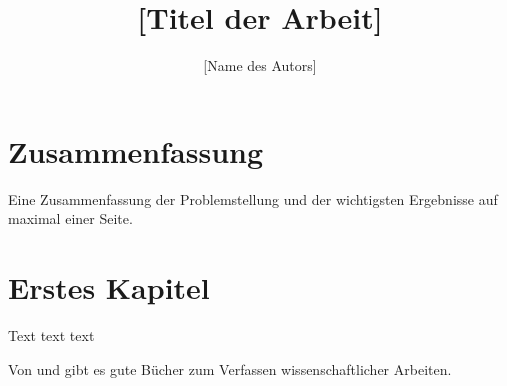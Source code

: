 \documentclass[doctype=Diplomarbeit,lang=ngerman]{ldvbook}
\begin{document}
\title{[Titel der Arbeit]}
\author{[Name des Autors]}
\maketitle


\chapter*{Zusammenfassung}

Eine Zusammenfassung der Problemstellung und der wichtigsten
Ergebnisse auf maximal einer Seite.


\tableofcontents






\chapter{Erstes Kapitel}

Text text text 

Von \citet[deutsch]{Niederhauser2006} und
\citet[englisch]{Gustavii2003} gibt es gute Bücher zum Verfassen
wissenschaftlicher Arbeiten.




\end{document}
